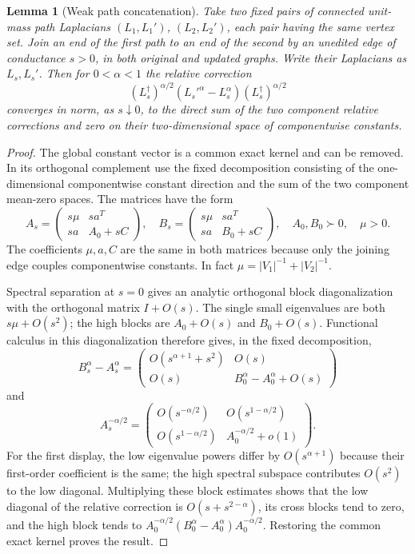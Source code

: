 \documentclass[11pt]{article}
\newtheorem{lemma}[theorem]{Lemma}
\begin{document}
\begin{lemma}[Weak path concatenation]\label{lem:glue}
Take two fixed pairs of connected unit-mass path Laplacians
$(L_1,L_1')$, $(L_2,L_2')$, each pair having the same vertex set. Join
an end of the first path to an end of the second by an unedited edge of
conductance $s>0$, in both original and updated graphs. Write their
Laplacians as $L_s,L_s'$. Then for $0<\alpha<1$ the relative correction
\[
 (L_s^\dagger)^{\alpha/2}(L_s'^\alpha-L_s^\alpha)
                  (L_s^\dagger)^{\alpha/2}
\]
converges in norm, as $s\downarrow0$, to the direct sum of the two
component relative corrections and zero on their two-dimensional space
of componentwise constants.
\end{lemma}
\begin{proof}
The global constant vector is a common exact kernel and can be removed.
In its orthogonal complement use the fixed decomposition consisting of
the one-dimensional componentwise constant direction and the sum of the
two component mean-zero spaces. The matrices have the form
\[
 A_s=\begin{pmatrix}s\mu&sa^T\\sa&A_0+sC\end{pmatrix},\quad
 B_s=\begin{pmatrix}s\mu&sa^T\\sa&B_0+sC\end{pmatrix},
 \quad A_0,B_0\succ0,\quad \mu>0.
\]
The coefficients $\mu,a,C$ are the same in both matrices because only
the joining edge couples componentwise constants. In fact
$\mu=|V_1|^{-1}+|V_2|^{-1}$.

Spectral separation at $s=0$ gives an analytic orthogonal
block diagonalization with the orthogonal matrix $I+O(s)$. The single
small eigenvalues are both $s\mu+O(s^2)$; the high blocks are
$A_0+O(s)$ and $B_0+O(s)$. Functional calculus in this diagonalization
therefore gives, in the fixed decomposition,
\[
 B_s^\alpha-A_s^\alpha=
 \begin{pmatrix}
 O(s^{\alpha+1}+s^2)&O(s)\\
 O(s)&B_0^\alpha-A_0^\alpha+O(s)
 \end{pmatrix}
\]
and
\[
 A_s^{-\alpha/2}=
 \begin{pmatrix}
 O(s^{-\alpha/2})&O(s^{1-\alpha/2})\\
 O(s^{1-\alpha/2})&A_0^{-\alpha/2}+o(1)
 \end{pmatrix}.
\]
For the first display, the low eigenvalue powers differ by
$O(s^{\alpha+1})$ because their first-order coefficient is the same;
the high spectral subspace contributes $O(s^2)$ to the low diagonal.
Multiplying these block estimates shows that the low diagonal of the
relative correction is $O(s+s^{2-\alpha})$, its cross blocks tend to
zero, and the high block tends to
$A_0^{-\alpha/2}(B_0^\alpha-A_0^\alpha)A_0^{-\alpha/2}$.
Restoring the common exact kernel proves the result.
\end{proof}
\end{document}
